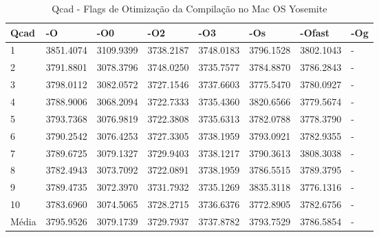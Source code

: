\begin{table}[!ht]
\centering
\caption{Qcad - Flags de Otimização da Compilação no Mac OS Yosemite}
\label{tab:otimizacao_compilacao:mac:qcad}
\begin{tabular}{llllllll}
\textbf{Qcad}         & \textbf{-O}  & \textbf{-O0}   & \textbf{-O2} & \textbf{-O3} & \textbf{-Os} & \textbf{-Ofast} & \textbf{-Og} \\ \toprule
1                     & 3851.4074    &   3109.9399    &   3738.2187  &   3748.0183  &   3796.1528  &   3802.1043     &  -           \\ 
2                     & 3791.8801    &   3078.3796    &   3748.0250  &   3735.7577  &   3784.8870  &   3786.2843     &  -           \\ 
3                     & 3798.0112    &   3082.0572    &   3727.1546  &   3737.6603  &   3775.5470  &   3780.0927     &  -           \\ 
4                     & 3788.9006    &   3068.2094    &   3722.7333  &   3735.4360  &   3820.6566  &   3779.5674     &  -           \\ 
5                     & 3793.7368    &   3076.9819    &   3722.3808  &   3735.6313  &   3782.0788  &   3778.3790     &  -           \\ 
6                     & 3790.2542    &   3076.4253    &   3727.3305  &   3738.1959  &   3793.0921  &   3782.9355     &  -           \\ 
7                     & 3789.6725    &   3079.1327    &   3729.9403  &   3738.1217  &   3790.3613  &   3808.3038     &  -           \\ 
8                     & 3782.4943    &   3073.7092    &   3722.0891  &   3738.1959  &   3786.5515  &   3789.3795     &  -           \\ 
9                     & 3789.4735    &   3072.3970    &   3731.7932  &   3735.1269  &   3835.3118  &   3776.1316     &  -           \\ 
10                    & 3783.6960    &   3074.5065    &   3728.2715  &   3736.6376  &   3772.8905  &   3782.6756     &  -           \\ \bottomrule
Média                 & 3795.9526    &   3079.1739    &   3729.7937  &   3737.8782  &   3793.7529  &   3786.5854     &  -           \\ 
\end{tabular}
\end{table}


